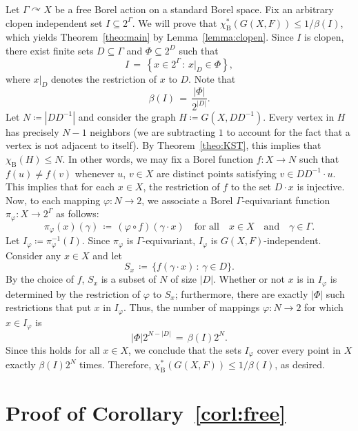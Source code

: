 \documentclass[10pt]{amsart}
\theoremstyle{definition}
\newcommand{\0}{\varnothing}
\newcommand{\set}[1]{\{#1\}}
\renewcommand{\phi}{\varphi}
\renewcommand{\leq}{\leqslant}
\newcommand{\defeq}{\coloneqq}
\newcommand{\rest}[2]{{{#1}\vert_{#2}}}
\newcommand{\rmB}{\mathrm{B}}
\begin{document}
Let $\Gamma \curvearrowright X$ be a free Borel action on a standard Borel space. Fix an arbitrary clopen independent set $I \subseteq 2^\Gamma$. We will prove that $\chi^\ast_\rmB(G(X,F)) \leq 1/\beta(I)$, which yields Theorem~\ref{theo:main} by Lemma~\ref{lemma:clopen}. Since $I$ is clopen, there exist finite sets $D \subseteq \Gamma$ and $\Phi \subseteq 2^D$ such that
\[
I \,=\, \left\{x \in 2^\Gamma \,:\, \rest{x}{D} \in \Phi\right\},
\]
where $\rest{x}{D}$ denotes the restriction of $x$ to $D$. Note that
\[
\beta(I) \,=\, \frac{|\Phi|}{2^{|D|}}.
\]
Let $N
\defeq |DD^{-1}|$ and consider the graph $H
\defeq G(X, DD^{-1})$. Every vertex in $H$ has precisely $N-1$ neighbors (we are subtracting $1$ to account for the fact that a vertex is not adjacent to itself). By Theorem~\ref{theo:KST}, this implies that $\chi_\rmB(H) \leq N$. In other words, we may fix a Borel function $f \colon X \to N$ such that $f(u) \neq f(v)$ whenever $u$, $v \in X$ are distinct points satisfying $v \in DD^{-1} \cdot u$. This implies that for each $x \in X$, the restriction of $f$ to the set $D \cdot x$ is injective. Now, to each mapping $\phi \colon N \to 2$, we associate a Borel $\Gamma$-equivariant function $\pi_\phi \colon X \to 2^\Gamma$ as follows:
\[
\pi_\phi(x)(\gamma) \,
\defeq\, (\phi \circ f)(\gamma \cdot x) \quad \text{for all}\quad x \in X \quad\text{and}\quad \gamma \in \Gamma.
\]
Let $I_\phi
\defeq \pi_\phi^{-1}(I)$. Since $\pi_\phi$ is $\Gamma$-equivariant, $I_\phi$ is $G(X, F)$-independent. Consider any $x \in X$ and let
\[
S_x \,
\defeq\, \set{f(\gamma \cdot x) \,:\, \gamma \in D}.
\]
By the choice of $f$, $S_x$ is a subset of $N$ of size $|D|$. Whether or not $x$ is in $I_\phi$ is determined by the restriction of $\phi$ to $S_x$; furthermore, there are exactly $|\Phi|$ such restrictions that put $x$ in $I_\phi$. Thus, the number of mappings $\phi \colon N \to 2$ for which $x \in I_\phi$ is
\[
|\Phi|2^{N - |D|} \,=\, \beta(I)2^N.
\]
Since this holds for all $x \in X$, we conclude that the sets $I_\phi$ cover every point in $X$ exactly $\beta(I)2^N$ times. Therefore, $\chi^\ast_\rmB(G(X,F)) \leq 1/\beta(I)$, as desired.

\section{Proof of Corollary~\ref{corl:free}}\label{sec:corl}
\end{document}
